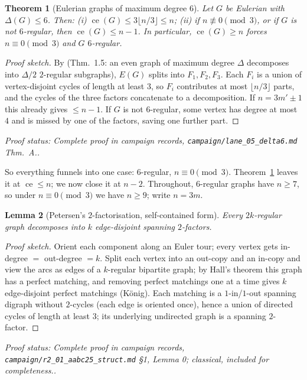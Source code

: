 \documentclass[a4paper,11pt]{amsart}
\newtheorem{theorem}{Theorem}[section]
\newtheorem{lemma}[theorem]{Lemma}
\theoremstyle{definition}
\theoremstyle{remark}
\newcommand{\ce}{\operatorname{ce}}
\newcommand{\proofsrc}[1]{\par\smallskip\noindent\begin{sloppypar}\small\emph{Proof status: #1.}\end{sloppypar}\par\smallskip}
\begin{document}
\begin{theorem}[Eulerian graphs of maximum degree $6$]\label{thm:d6even}
Let $G$ be Eulerian with $\Delta(G)\le6$. Then:
(i) $\ce(G)\le 3\lfloor n/3\rfloor\le n$;
(ii) if $n\not\equiv0\pmod3$, or if $G$ is not $6$-regular, then $\ce(G)\le n-1$.
In particular, $\ce(G)\ge n$ forces $n\equiv0\pmod3$ and $G$ $6$-regular.
\end{theorem}
\begin{proof}[Proof sketch]
By \cite{AABC25} (Thm.~1.5: an even graph of maximum degree $\Delta$ decomposes into $\Delta/2$
$2$-regular subgraphs), $E(G)$ splits into $F_1,F_2,F_3$. Each $F_i$ is a union of vertex-disjoint cycles
of length at least $3$, so $F_i$ contributes at most $\lfloor n/3\rfloor$ parts, and the cycles of the three
factors concatenate to a decomposition. If $n=3m'\pm1$ this already gives $\le n-1$. If $G$ is not
$6$-regular, some vertex has degree at most $4$ and is missed by one of the factors, saving one further
part.
\end{proof}
\proofsrc{Complete proof in campaign records, \texttt{campaign/lane\_05\_delta6.md} Thm.~A.}

So everything funnels into one case: $6$-regular, $n\equiv0\pmod3$. Theorem~\ref{thm:d6even} leaves it at
$\ce\le n$; we now close it at $n-2$. Throughout, $6$-regular graphs have $n\ge7$, so under
$n\equiv0\pmod3$ we have $n\ge9$; write $n=3m$.

\begin{lemma}[Petersen's $2$-factorisation, self-contained form]\label{lem:petersen2f}
Every $2k$-regular graph decomposes into $k$ edge-disjoint spanning $2$-factors.
\end{lemma}
\begin{proof}[Proof sketch]
Orient each component along an Euler tour; every vertex gets in-degree $=$ out-degree $=k$. Split each
vertex into an out-copy and an in-copy and view the arcs as edges of a $k$-regular bipartite graph; by
Hall's theorem this graph has a perfect matching, and removing perfect matchings one at a time gives $k$
edge-disjoint perfect matchings (K\"onig). Each matching is a $1$-in/$1$-out spanning digraph without
$2$-cycles (each edge is oriented once), hence a union of directed cycles of length at least $3$; its
underlying undirected graph is a spanning $2$-factor.
\end{proof}
\proofsrc{Complete proof in campaign records, \texttt{campaign/r2\_01\_aabc25\_struct.md} \S1, Lemma 0;
classical, included for completeness.}
\end{document}
